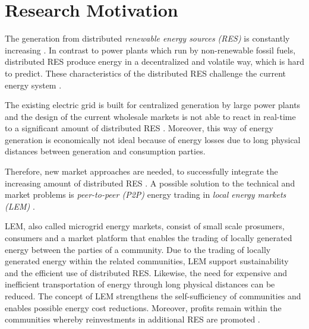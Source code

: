 \section{Research Motivation}
\label{sec:research_motivation}

The generation from distributed \textit{renewable energy sources (RES)} is constantly increasing . 
In contrast to power plants which run by non-renewable fossil fuels, distributed RES produce energy in a decentralized and volatile way, which is hard to predict. 
These characteristics of the distributed RES challenge the current energy system .

The existing electric grid is built for centralized generation by large power plants 
and the design of the current wholesale markets
is not able to react in real-time to a significant amount of distributed RES  . 
Moreover, this way of energy generation is economically not ideal because of energy losses due to long physical
distances between generation and consumption parties. 

Therefore, new market approaches are needed, to successfully integrate the increasing amount of distributed RES . 
A possible solution to the technical and market problems is \textit{peer-to-peer (P2P)} energy trading in \textit{local energy markets (LEM)} . 

LEM, also called microgrid energy markets, consist of small scale prosumers, consumers and a market platform that enables the trading 
of locally generated energy between the parties of a community.
Due to the trading of locally generated energy within the related communities,
LEM support sustainability and the efficient use of distributed RES.
Likewise, the need for expensive and inefficient transportation of energy through long physical 
distances can be reduced. The concept of LEM strengthens the self-sufficiency of communities and 
enables possible energy cost reductions. Moreover, profits remain within the communities 
whereby reinvestments in additional RES are promoted . 

